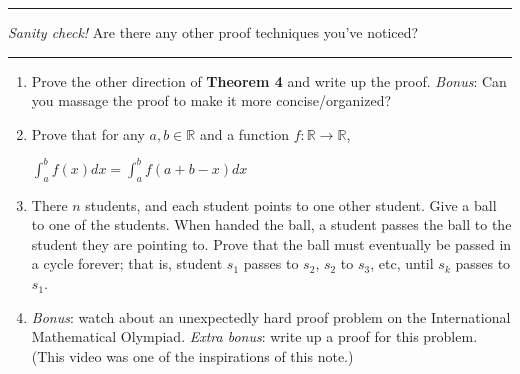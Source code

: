\documentclass[11pt]{article}
\begin{document}
    \rule{\textwidth}{0.4pt}
    
    \vspace{-5pt}
    \textit{Sanity check!} Are there any other proof techniques you've noticed?
    
    \vspace{-10pt}
    \rule{\textwidth}{0.4pt}


    \begin{enumerate}
        \item
        Prove the other direction of \textbf{Theorem 4} and write up the proof. \textit{Bonus}:
        Can you massage the proof to make it more concise/organized?
        
        \item
        Prove that for any $a,b\in\mathbb R$ and a function $f:\mathbb R\rightarrow\mathbb R$,
        
        $\displaystyle\int_a^bf(x)dx=\int_a^bf(a+b-x)dx$
        
        \item
        There $n$ students, and each student points to one other student. Give
        a ball to one of the students. When handed the ball, a student passes the ball
        to the student they are pointing to. Prove that the ball must eventually be
        passed in a cycle forever; that is, student $s_1$ passes to $s_2$, $s_2$ to $s_3$,
        etc, until $s_k$ passes to $s_1$.
        
        \item
        \textit{Bonus}: watch \href{https://youtu.be/M64HUIJFTZM}{\color{blue}{this video}} about an unexpectedly
        hard proof problem on the International Mathematical Olympiad. \textit{Extra bonus}: write
        up a proof for this problem. (This video was one of the inspirations of this note.)
        
    \end{enumerate}
\end{document}
